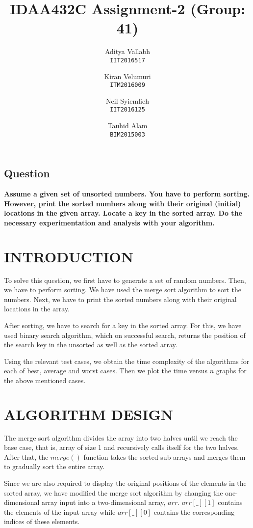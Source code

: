 \documentclass[letterpaper, 11 pt, conference]{ieeeconf}  %
\title{\LARGE 
IDAA432C Assignment-2 (Group: 41)
}
\author{
  Aditya Vallabh\\
  \texttt{IIT2016517}
  \and
  Kiran Velumuri\\
  \texttt{ITM2016009}
  \and
  Neil Syiemlieh\\
  \texttt{IIT2016125}
  \and
  Tauhid Alam\\
  \texttt{BIM2015003}
}
\begin{document}
\maketitle
\thispagestyle{empty}
\pagestyle{empty}



\subsection*{ \textbf{Question} }
\textbf{Assume a given set of unsorted numbers. You have to perform sorting. However, print the sorted numbers along with their original (initial) locations in the given array. Locate a key in the sorted array. Do the necessary experimentation and analysis with your algorithm.}


\section{INTRODUCTION}
To solve this question, we first have to generate a set of random numbers. Then, we have to perform sorting. We have used the merge sort algorithm to sort the numbers. Next, we have to print the sorted numbers along with their original locations in the array.

After sorting, we have to search for a key in the sorted array. For this, we have used binary search algorithm, which on successful search, returns the position of the search key in the unsorted as well as the sorted array.

Using the relevant test cases, we obtain the time complexity of the algorithms for each of best, average and worst cases. Then we plot the time versus $n$ graphs for the above mentioned cases.


\section{ALGORITHM DESIGN}
The merge sort algorithm divides the array into two halves until we reach the base case, that is, array of size 1 and recursively calls itself for the two halves. After that, the $merge()$ function takes the sorted sub-arrays and merges them to gradually sort the entire array.

Since we are also required to display the original positions of the elements in the sorted array, we have modified the merge sort algorithm by changing the one-dimensional array input into a two-dimensional array, $arr$. $arr[\_][1]$ contains the elements of the input array while $arr[\_][0]$ contains the corresponding indices of these elements.
\end{document}
